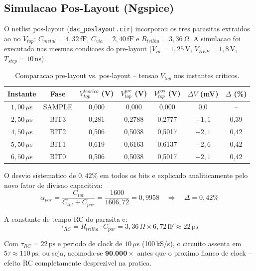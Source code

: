 \documentclass[12pt, a4paper]{article}
\begin{document}
\subsection{Simulacao Pos-Layout (Ngspice)}

O netlist pos-layout (\texttt{dac\_poslayout.cir}) incorporou os tres parasitas extraidos
ao no $V_{top}$: $C_{metal} = 4{,}32\,\text{fF}$, $C_{via} = 2{,}40\,\text{fF}$ e
$R_{trilha} = 3{,}36\,\Omega$. A simulacao foi executada nas mesmas condicoes do pre-layout
($V_{in} = 1{,}25\,\text{V}$, $V_{REF} = 1{,}8\,\text{V}$, $T_{step} = 10\,\text{ns}$).

\begin{table}[h!]
\centering
\caption{Comparacao pre-layout vs. pos-layout -- tensao $V_{top}$ nos instantes criticos.}
\label{tab:poslayout}
\begin{tabular}{ccccccc}
\toprule
\textbf{Instante} & \textbf{Fase} & $V_{top}^{teorico}$ (V) & $V_{top}^{pre}$ (V) & $V_{top}^{pos}$ (V) & $\Delta V$ (mV) & $\Delta$ (\%) \\
\midrule
$1{,}00\,\mu$s & SAMPLE  & 0{,}000 & 0{,}000 & 0{,}000 & 0{,}0 & -- \\
$2{,}50\,\mu$s & BIT3    & 0{,}281 & 0{,}2788 & 0{,}2777 & $-1{,}1$ & 0{,}39 \\
$4{,}50\,\mu$s & BIT2    & 0{,}506 & 0{,}5038 & 0{,}5017 & $-2{,}1$ & 0{,}42 \\
$5{,}50\,\mu$s & BIT1    & 0{,}619 & 0{,}6163 & 0{,}6137 & $-2{,}6$ & 0{,}42 \\
$6{,}50\,\mu$s & BIT0    & 0{,}506 & 0{,}5038 & 0{,}5017 & $-2{,}1$ & 0{,}42 \\
\bottomrule
\end{tabular}
\end{table}

O desvio sistematico de $0{,}42\%$ em todos os bits e explicado analiticamente pelo novo
fator de divisao capacitiva:
\begin{equation}
  \alpha_{par} = \frac{C_{tot}}{C_{tot} + C_{par}} = \frac{1600}{1606{,}72} = 0{,}9958
  \quad \Rightarrow \quad \Delta = 0{,}42\%
\end{equation}

A constante de tempo RC do parasita e:
\begin{equation}
  \tau_{RC} = R_{trilha} \cdot C_{par} = 3{,}36\,\Omega \times 6{,}72\,\text{fF} \approx 22\,\text{ps}
\end{equation}

Com $\tau_{RC} = 22\,\text{ps}$ e periodo de clock de $10\,\mu$s (100\,kS/s), o circuito
assenta em $5\tau \approx 110\,\text{ps}$, ou seja, acomoda-se $\mathbf{90{.}000\times}$
antes que o proximo flanco de clock -- efeito RC completamente desprezivel na pratica.
\end{document}
